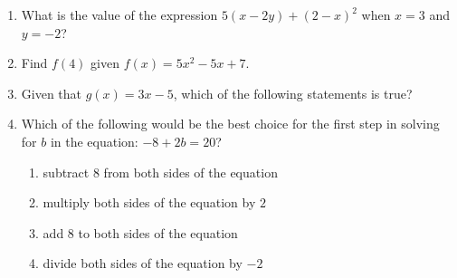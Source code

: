 \documentclass{article}
\begin{document}
\begin{enumerate}
\item What is the value of the expression $5(x-2y)+(2-x)^2$ when $x=3$ and $y=-2$?

  \begin{enumerate}
  \end{enumerate}
  
 \item Find $f(4)$ given $f(x)=5x^2-5x+7$.

  \begin{enumerate}
  \end{enumerate}

 \item Given that $g(x)=3x-5$, which of the following statements is true?

  \begin{enumerate}
  \end{enumerate}
  
\pagebreak


\item Which of the following would be the best choice for the first step in solving for $b$ in the equation: $-8+2b=20$?

  \begin{enumerate}
  \item subtract $8$ from both sides of the equation
  \item multiply both sides of the equation by $2$
  \item add $8$ to both sides of the equation %
  \item divide both sides of the equation by $-2$
  \end{enumerate}
  

\end{enumerate}
\end{document}
